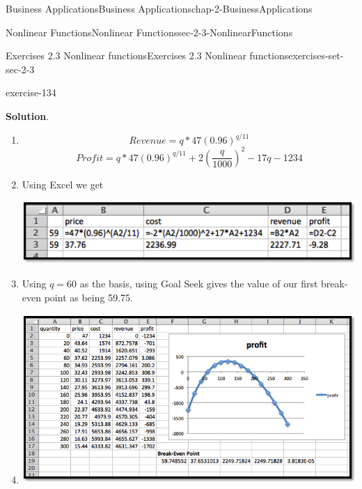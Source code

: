 \documentclass[oneside,10pt,]{book}
\numberwithin{equation}{section}
\begin{document}
\begin{chapterptx}{Business Applications}{}{Business Applications}{}{}{chap-2-BusinessApplications}
\begin{sectionptx}{Nonlinear Functions}{}{Nonlinear Functions}{}{}{sec-2-3-NonlinearFunctions}
\begin{exercises-subsection-numberless}{Exercises 2.3 Nonlinear functions}{}{Exercises 2.3 Nonlinear functions}{}{}{exercises-set-sec-2-3}
\begin{exercisegroup}
\begin{divisionexerciseeg}{19}{}{}{exercise-134}
\par\smallskip%
\noindent\textbf{Solution}.\hypertarget{solution-65}{}\quad%
\leavevmode%
\begin{enumerate}[label=(\alph*)]
\item\hypertarget{li-264}{}%
\begin{equation*}
Revenue=q*47(0.96)^{q/11}
\end{equation*}
%
\begin{equation*}
Profit=q*47(0.96)^{q/11}+2(\frac{q}{1000})^2-17q-1234
\end{equation*}
%
\item\hypertarget{li-265}{}\hypertarget{p-878}{}%
Using Excel we get%
\begin{sidebyside}{1}{0}{0}{0}%
\begin{sbspanel}{1}%
\includegraphics[width=1\linewidth]{images/sec2-3-sol19a.png}
\end{sbspanel}%
\end{sidebyside}%
\item\hypertarget{li-266}{}\hypertarget{p-879}{}%
Using \(q = 60\) as the basis, using Goal Seek gives the value of our first break-even point as being 59.75.%
\item\hypertarget{li-267}{}\leavevmode%
\begin{sidebyside}{1}{0}{0}{0}%
\begin{sbspanel}{1}%
\includegraphics[width=1\linewidth]{images/sec2-3-sol19b.png}
\end{sbspanel}%
\end{sidebyside}%
%
\end{enumerate}

\end{divisionexerciseeg}
\end{exercisegroup}
\end{exercises-subsection-numberless}
\end{sectionptx}
\end{chapterptx}
\end{document}
